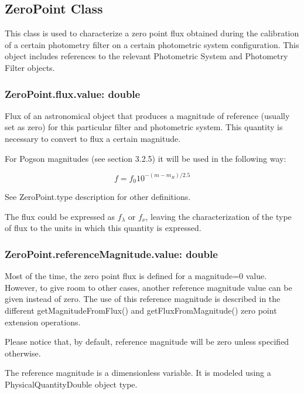 \documentclass[11pt,a4paper]{ivoa}
\begin{document}
\subsection{ZeroPoint Class}
This class is used to characterize a zero point flux obtained during the 
calibration of a certain photometry filter on a certain photometric system 
configuration. This object includes references to the relevant Photometric 
System and Photometry Filter objects.
\par

\subsubsection{ZeroPoint.flux.value: double}
Flux of an astronomical object that produces a magnitude of reference 
(usually set as zero) for this particular filter and photometric system. 
This quantity is necessary to convert to flux a certain magnitude.
\par

For Pogson magnitudes (see section 3.2.5) it will be used in the following way:
\par
\begin{equation} \label{eq:24}
f = f_0 10^{-(m-m_R )/2.5}
\end{equation}

See ZeroPoint.type description for other definitions.
\par

The flux could be expressed as $f_{\lambda}$ or $f_{\nu}$, leaving the 
characterization of the type of flux to the units in which this quantity 
is expressed.
\par

\subsubsection{ZeroPoint.referenceMagnitude.value: double}
Most of the time, the zero point flux is defined for a magnitude=0 value. 
However, to give room to other cases, another reference magnitude value can 
be given instead of zero. The use of this reference magnitude is described in 
the different getMagnitudeFromFlux() and getFluxFromMagnitude() zero point 
extension operations.
\par

Please notice that, by default, reference magnitude will be zero unless 
specified otherwise.
\par

The reference magnitude is a dimensionless variable. It is modeled using a 
PhysicalQuantityDouble object type.
\par
\end{document}
